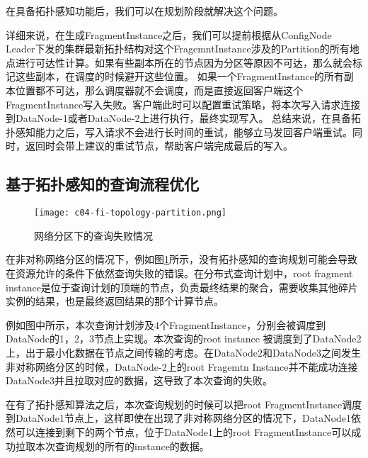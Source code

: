在具备拓扑感知功能后，我们可以在规划阶段就解决这个问题。

详细来说，在生成FragmentInstance之后，我们可以提前根据从ConfigNode Leader下发的集群最新拓扑结构对这个FragemntInstance涉及的Partition的所有地点进行可达性计算。如果有些副本所在的节点因为分区等原因不可达，那么就会标记这些副本，在调度的时候避开这些位置。
如果一个FragmentInstance的所有副本位置都不可达，那么调度器就不会调度，而是直接返回客户端这个FragmentInstance写入失败。客户端此时可以配置重试策略，将本次写入请求连接到DataNode-1或者DataNode-2上进行执行，最终实现写入。
总结来说，在具备拓扑感知能力之后，写入请求不会进行长时间的重试，能够立马发回客户端重试。同时，返回时会带上建议的重试节点，帮助客户端完成最后的写入。

\subsection{基于拓扑感知的查询流程优化}

\begin{figure}
  \centering
  \texttt{[image: c04-fi-topology-partition.png]}
  \caption{网络分区下的查询失败情况}
  \label{fig:fi-topology-partition}
\end{figure}

在非对称网络分区的情况下，例如图\ref{fig:fi-topology-partition}所示，没有拓扑感知的查询规划可能会导致在资源允许的条件下依然查询失败的错误。在分布式查询计划中，root fragment instance是位于查询计划的顶端的节点，负责最终结果的聚合，需要收集其他碎片实例的结果，也是最终返回结果的那个计算节点。

例如图中所示，本次查询计划涉及4个FragmentInstance，分别会被调度到DataNode的1，2，3节点上实现。本次查询的root instance 被调度到了DataNode2上，出于最小化数据在节点之间传输的考虑。在DataNode2和DataNode3之间发生非对称网络分区的时候，DataNode-2上的root Fragemtn Instance并不能成功连接DataNode3并且拉取对应的数据，这导致了本次查询的失败。

在有了拓扑感知算法之后，本次查询规划的时候可以把root FragmentInstance调度到DataNode1节点上，这样即使在出现了非对称网络分区的情况下，DataNode1依然可以连接到剩下的两个节点，位于DataNode1上的root FragmentInstance可以成功拉取本次查询规划的所有的instance的数据。

